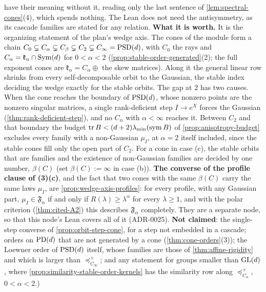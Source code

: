 \begin{theorem}
{have their meaning without it, reading only the last sentence of \ref{lem:spectral-cones}(4), which spends
nothing. The Lean does not need the antisymmetry, as its cascade families are stated for any relation.
\textbf{What it is worth.} It is the organizing statement of the plan's wedge axis. The cones of the module form
a chain $C_0 \subsetneq C_\alpha \subsetneq C_\beta \subsetneq C_2 \subsetneq C_\infty = \mathrm{PSD}(d)$, with
$C_0$ the rays and $C_\alpha = \mathfrak k_\alpha \cap \mathrm{Sym}(d)$ for $0 < \alpha < 2$ (\ref{prop:stable-order-generated}(2);
the full exponent cones are $\mathfrak k_\alpha = C_\alpha \oplus$ the skew matrices). Along it the general linear row
shrinks from every self-decomposable orbit to the Gaussian, the stable index deciding the wedge exactly
for the stable orbits. The gap at $2$ has two causes. When the cone reaches the boundary of $\mathrm{PSD}(d)$, whose
nonzero points are the nonzero singular matrices, a single rank-deficient step $I \to e^X$ forces the
Gaussian (\ref{thm:rank-deficient-step}), and no $C_\alpha$ with $\alpha < \infty$ reaches it. Between $C_2$ and
that boundary the budget $\operatorname{tr} B < (d+2)\lambda_{\min}(\mathrm{sym}\,B)$ of \ref{prop:anisotropy-budget}
excludes every family with a non-Gaussian $\mu_I$, at $\alpha = 2$ itself included, since the stable cones fill only the open part of
$C_2$. For a cone in case (c), the stable orbits that are families and the existence of non-Gaussian
families are decided by one number, $\beta(C)$ (set $\beta(C) := \infty$ in case (b)). \textbf{The
converse of the profile clause of (3)(c)}, and the fact that two cones with the same $\beta(C)$ carry the
same laws $\mu_I$, are \ref{prop:wedge-axis-profiles}: for every profile, with any Gaussian part,
$\mu_I \in \mathfrak F_\alpha$ if and only if $R(\lambda) \ge \lambda^\alpha$ for every $\lambda \ge 1$, and with the
polar criterion (\ref{thm:cited-A2}) this describes $\mathfrak F_\alpha$ completely. They are a separate node, so that this node's Lean covers all of it (ADR-0025). \textbf{Not claimed}: the single-step
converse of \ref{prop:orbit-step-cone}, for a step not embedded in a cascade; orders on $\mathrm{PD}(d)$ that are not generated by a cone
(\ref{thm:cone-orders}(3)); the Loewner order of $\mathrm{PSD}(d)$ itself, whose families are those of
\ref{thm:affine-rigidity} and which is larger than $\preceq^+_{C_\infty}$; and any statement for groups
smaller than $\mathrm{GL}(d)$, where \ref{prop:similarity-stable-order-kernels} has the similarity row along
$\preceq^+_{C_\alpha}$, $0 < \alpha < 2$.)}
\end{theorem}

